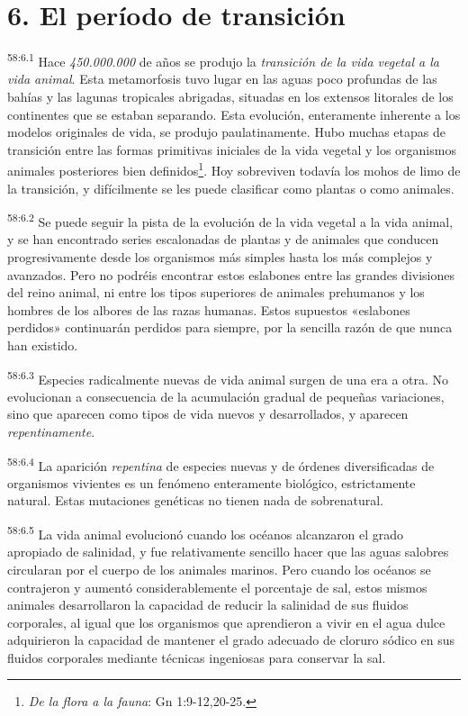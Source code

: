 \section*{6. El período de transición}
\par
\textsuperscript{58:6.1} Hace \textit{450.000.000} de años se produjo la \textit{transición de la vida vegetal a la vida animal}. Esta metamorfosis tuvo lugar en las aguas poco profundas de las bahías y las lagunas tropicales abrigadas, situadas en los extensos litorales de los continentes que se estaban separando. Esta evolución, enteramente inherente a los modelos originales de vida, se produjo paulatinamente. Hubo muchas etapas de transición entre las formas primitivas iniciales de la vida vegetal y los organismos animales posteriores bien definidos\footnote{\textit{De la flora a la fauna}: Gn 1:9-12,20-25.}. Hoy sobreviven todavía los mohos de limo de la transición, y difícilmente se les puede clasificar como plantas o como animales.

\par
\textsuperscript{58:6.2} Se puede seguir la pista de la evolución de la vida vegetal a la vida animal, y se han encontrado series escalonadas de plantas y de animales que conducen progresivamente desde los organismos más simples hasta los más complejos y avanzados. Pero no podréis encontrar estos eslabones entre las grandes divisiones del reino animal, ni entre los tipos superiores de animales prehumanos y los hombres de los albores de las razas humanas. Estos supuestos «eslabones perdidos» continuarán perdidos para siempre, por la sencilla razón de que nunca han existido.

\par
\textsuperscript{58:6.3} Especies radicalmente nuevas de vida animal surgen de una era a otra. No evolucionan a consecuencia de la acumulación gradual de pequeñas variaciones, sino que aparecen como tipos de vida nuevos y desarrollados, y aparecen \textit{repentinamente}.

\par
\textsuperscript{58:6.4} La aparición \textit{repentina} de especies nuevas y de órdenes diversificadas de organismos vivientes es un fenómeno enteramente biológico, estrictamente natural. Estas mutaciones genéticas no tienen nada de sobrenatural.

\par
\textsuperscript{58:6.5} La vida animal evolucionó cuando los océanos alcanzaron el grado apropiado de salinidad, y fue relativamente sencillo hacer que las aguas salobres circularan por el cuerpo de los animales marinos. Pero cuando los océanos se contrajeron y aumentó considerablemente el porcentaje de sal, estos mismos animales desarrollaron la capacidad de reducir la salinidad de sus fluidos corporales, al igual que los organismos que aprendieron a vivir en el agua dulce adquirieron la capacidad de mantener el grado adecuado de cloruro sódico en sus fluidos corporales mediante técnicas ingeniosas para conservar la sal.

